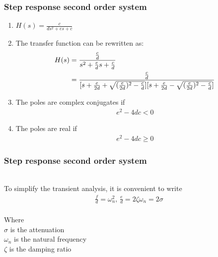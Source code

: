 \begin{frame}
\frametitle{Step response second order system}
\begin{enumerate}
\item $H(s) = \frac{c}{ds^2+es+c}$
\vspace{0.25cm}
\pause
\item The transfer function can be rewritten as:
\vspace{-0.35cm}
\\ 
\begin{align*}
H(s) &= \frac{\frac{c}{d}}{s^2+\frac{e}{d}s+\frac{c}{d}}
\vspace{-0.1cm}\\ &= \frac{\frac{c}{d}}{[s+\frac{e}{2d}+\sqrt{(\frac{e}{2d})^2-\frac{c}{d}}][s+\frac{e}{2d}-\sqrt{(\frac{e}{2d})^2-\frac{c}{d}}]}
\end{align*}
\pause
\item The poles are complex conjugates if
\\ \vspace{-0.5cm}
\begin{align*}
e^2 -4dc <0
\end{align*}
\vspace{-0.45cm}
\pause
\item The poles are real if
\\
\vspace{-0.45cm}
\begin{align*}
e^2 -4dc\ge 0
\end{align*}
\end{enumerate}
\end{frame}

\begin{frame}
\frametitle{Step response second order system}

\\ To simplify the transient analysis, it is convenient to write
\\ 
\begin{align*}
\frac{f}{d} = \omega_n ^2\text{, } \frac{e}{d}=2\zeta\omega_n=2\sigma
\end{align*}
\pause
\\ Where 
\vspace{0.15cm}
\\ $\sigma$ is the attenuation 
\vspace{0.3cm}
\\$\omega_n$ is the natural frequency 
\vspace{0.3cm}
\\ $\zeta$ is the damping ratio
\vspace{0.25cm}
\end{frame}

